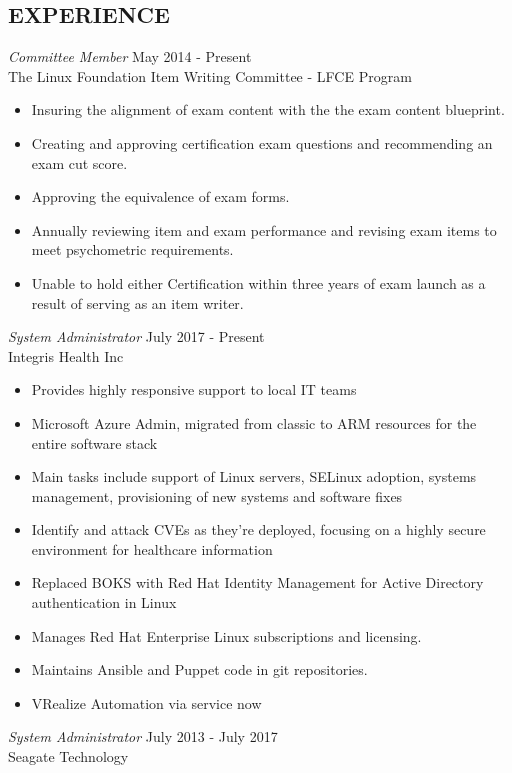 \documentclass[margin]{res}
\begin{document}
\begin{resume}
\section{EXPERIENCE}
	{\sl Committee Member} \hfill May 2014 - Present \\
    The Linux Foundation Item Writing Committee - LFCE Program
    \begin{itemize}  \itemsep -2pt %
    \item Insuring the alignment of exam content with the the exam content blueprint.
    \item Creating and approving certification exam questions and recommending an exam cut score.
    \item Approving the equivalence of exam forms.
    \item Annually reviewing item and exam performance and revising exam items to meet psychometric requirements.
    \item Unable to hold either Certification within three years of exam launch as a result of serving as an item writer.
    \end{itemize}
	{\sl System Administrator} \hfill July 2017 - Present \\
	Integris Health Inc
	\begin{itemize}  \itemsep -2pt %
		\item Provides highly responsive support to local IT teams
		\item Microsoft Azure Admin, migrated from classic to ARM resources for the entire software stack
		\item Main tasks include support of Linux servers, SELinux adoption, systems management, provisioning of new systems and software fixes
		\item Identify and attack CVEs as they're deployed, focusing on a highly secure environment for healthcare information
		\item Replaced BOKS with Red Hat Identity Management for Active Directory authentication in Linux
		\item Manages Red Hat Enterprise Linux subscriptions and licensing.
		\item Maintains Ansible and Puppet code in git repositories.
		\item VRealize Automation via service now
	\end{itemize}
	\clearpage
	{\sl System Administrator} \hfill July 2013 - July 2017 \\
	Seagate Technology
	\begin{itemize}  \itemsep -2pt %

\end{itemize}
\end{resume}
\end{document}

